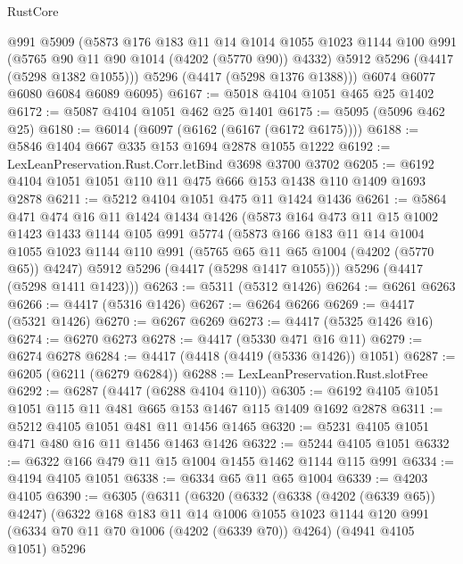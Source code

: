 \begin{lexlean}{RustCore}
\begin{coremodule}
        @991
        @5909
        (@5873
          @176
          @183
          @11
          @14
          @1014
          @1055
          @1023
          @1144
          @100
          @991
          (@5765 @90 @11 @90 @1014 (@4202 (@5770 @90)) @4332)
          @5912
          @5296
          (@4417 (@5298 @1382 @1055)))
        @5296
        (@4417 (@5298 @1376 @1388)))
      @6074
      @6077
      @6080
      @6084
      @6089
      @6095)
@6167 := @5018 @4104 @1051 @465 @25 @1402
@6172 := @5087 @4104 @1051 @462 @25 @1401
@6175 := @5095 (@5096 @462 @25)
@6180 := @6014 (@6097 (@6162 (@6167 (@6172 @6175))))
@6188 := @5846 @1404 @667 @335 @153 @1694 @2878 @1055 @1222
@6192 := LexLeanPreservation.Rust.Corr.letBind @3698 @3700 @3702
@6205 := @6192 @4104 @1051 @1051 @110 @11 @475 @666 @153 @1438 @110 @1409 @1693 @2878
@6211 := @5212 @4104 @1051 @475 @11 @1424 @1436
@6261 := @5864
    @471
    @474
    @16
    @11
    @1424
    @1434
    @1426
    (@5873
      @164
      @473
      @11
      @15
      @1002
      @1423
      @1433
      @1144
      @105
      @991
      @5774
      (@5873
        @166
        @183
        @11
        @14
        @1004
        @1055
        @1023
        @1144
        @110
        @991
        (@5765 @65 @11 @65 @1004 (@4202 (@5770 @65)) @4247)
        @5912
        @5296
        (@4417 (@5298 @1417 @1055)))
      @5296
      (@4417 (@5298 @1411 @1423)))
@6263 := @5311 (@5312 @1426)
@6264 := @6261 @6263
@6266 := @4417 (@5316 @1426)
@6267 := @6264 @6266
@6269 := @4417 (@5321 @1426)
@6270 := @6267 @6269
@6273 := @4417 (@5325 @1426 @16)
@6274 := @6270 @6273
@6278 := @4417 (@5330 @471 @16 @11)
@6279 := @6274 @6278
@6284 := @4417 (@4418 (@4419 (@5336 @1426)) @1051)
@6287 := @6205 (@6211 (@6279 @6284))
@6288 := LexLeanPreservation.Rust.slotFree
@6292 := @6287 (@4417 (@6288 @4104 @110))
@6305 := @6192 @4105 @1051 @1051 @115 @11 @481 @665 @153 @1467 @115 @1409 @1692 @2878
@6311 := @5212 @4105 @1051 @481 @11 @1456 @1465
@6320 := @5231 @4105 @1051 @471 @480 @16 @11 @1456 @1463 @1426
@6322 := @5244 @4105 @1051
@6332 := @6322 @166 @479 @11 @15 @1004 @1455 @1462 @1144 @115 @991
@6334 := @4194 @4105 @1051
@6338 := @6334 @65 @11 @65 @1004
@6339 := @4203 @4105
@6390 := @6305
    (@6311
      (@6320
        (@6332
          (@6338 (@4202 (@6339 @65)) @4247)
          (@6322
            @168
            @183
            @11
            @14
            @1006
            @1055
            @1023
            @1144
            @120
            @991
            (@6334 @70 @11 @70 @1006 (@4202 (@6339 @70)) @4264)
            (@4941 @4105 @1051)
            @5296

\end{coremodule}
\end{lexlean}

